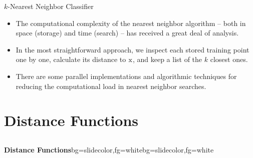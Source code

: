 \begin{frame}{$k$-Nearest Neighbor Classifier}
\begin{itemize}
\item The computational complexity of the nearest neighbor algorithm -- both in space (storage) and time (search) -- has received a great deal of analysis.
\item In the most straightforward approach, we inspect each stored training point one by one, calculate its distance to ${\rm x}$, and keep a list of the $k$ closest ones.
􏰂\item There are some parallel implementations and algorithmic techniques for reducing the computational load in nearest neighbor searches.
\end{itemize}
\end{frame}


\section{Distance Functions}
\subsection{}

\begin{frame}{}
\begin{variableblock}{\centering \Large \textbf{\vspace{4pt}\newline Distance Functions\vspace{4pt}}}{bg=slidecolor,fg=white}{bg=slidecolor,fg=white}
\end{variableblock}
\end{frame}

